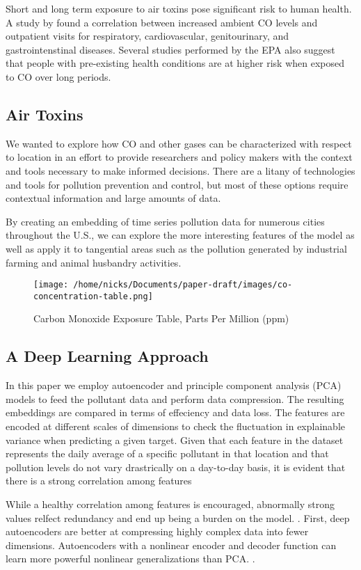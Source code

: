 \documentclass{article}
\begin{document}
Short and long term exposure to air toxins pose significant risk to human health. 
A study by \textcite{Wang19} found a correlation  between increased ambient CO
levels and outpatient visits for respiratory, cardiovascular, genitourinary, and gastrointenstinal
diseases. Several studies performed by the EPA also suggest that people with pre-existing health
conditions are at higher risk when exposed to CO over long periods.\par

\subsection{Air Toxins}
We wanted to explore how CO and other gases can be characterized with respect to location
in an effort to provide researchers and policy makers with the context and tools necessary to
make informed decisions. There are a litany of technologies and tools for pollution prevention
and control, but most of these options require contextual information and large amounts of data.
\par
By creating an embedding of time series pollution data for numerous cities throughout the U.S.,
we can explore the more interesting features of the model as well as apply it to tangential 
areas such as the pollution generated by industrial farming and animal husbandry activities.

\begin{figure}[h]
\texttt{[image: /home/nicks/Documents/paper-draft/images/co-concentration-table.png]}
    \caption{Carbon Monoxide Exposure Table, Parts Per Million (ppm)}
    \label{fig:co-exposure}
\end{figure}

\subsection{A Deep Learning Approach}
In this paper we employ autoencoder and  principle component analysis (PCA) models to 
feed the pollutant data and perform data compression. The resulting embeddings are 
compared in terms of effeciency and data loss. The features are encoded at different
scales of dimensions to check the fluctuation in explainable variance when predicting a 
given target. Given that each feature in the dataset represents the daily average of a 
specific pollutant in that location and that pollution levels do not vary drastrically 
on a day-to-day basis, it is evident that there is a strong correlation among features
\par While a healthy correlation among features is encouraged, abnormally strong values
relfect redundancy and end up being a burden on the model.
\parencite{featureredundancy}. First, deep autoencoders are better at compressing highly 
complex data into fewer dimensions. Autoencoders with a nonlinear encoder and decoder 
function can learn more powerful nonlinear generalizations than PCA. 
\parencite{Goodfellow16}.
\end{document}
